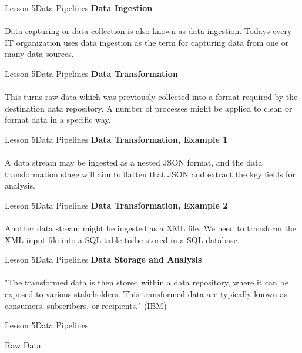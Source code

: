 \documentclass[aspectratio=1610]{beamer}
\begin{document}
\begin{frame}{Lesson 5}{Data Pipelines}
\LARGE
\textbf{Data Ingestion}\\~\\
Data capturing or data collection is also known as data ingestion. 
Todays every IT organization uses data ingestion as the term for 
capturing data from one or many data sources. 
\end{frame}



\begin{frame}{Lesson 5}{Data Pipelines}
\LARGE
\textbf{Data Transformation}\\~\\
This turns raw data which was previously collected into a format required by 
the destination data repository. A number of processes might be applied to 
clean or format data in a specific way.
\end{frame}



\begin{frame}{Lesson 5}{Data Pipelines}
\LARGE
\textbf{Data Transformation, Example 1}\\~\\
A data stream may be ingested as a nested JSON format, and the data 
transformation stage will aim to flatten that JSON and extract the
key fields for analysis.
\end{frame}


\begin{frame}{Lesson 5}{Data Pipelines}
\LARGE
\textbf{Data Transformation, Example 2}\\~\\
Another data stream might be ingested as a XML file. We need to 
transform the XML input file into a SQL table to be stored in a SQL
database.
\end{frame}



\begin{frame}{Lesson 5}{Data Pipelines}
\LARGE
\textbf{Data Storage and Analysis}\\~\\
"The transformed data is then stored within a data repository, where
it can be exposed to various stakeholders. This transformed data are
typically known as consumers, subscribers, or recipients." (IBM)
\end{frame}



\begin{frame}{Lesson 5}{Data Pipelines}
\Huge
\begin{center}
Raw Data
\end{center}
\end{frame}
\end{document}

